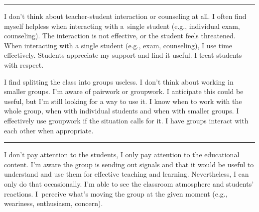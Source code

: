 \rule{\textwidth}{0.4pt}
{I don't think about teacher-student interaction or counseling at all.}
{I often find myself helpless when interacting with a~single student (e.g., individual exam, counseling). The interaction is not effective, or the student feels threatened.}
{When interacting with a single student (e.g., exam, counseling), I use time effectively. Students appreciate my support and find it useful. I treat students with respect. }

\newpage
{}
{I find splitting the class into groups useless. I don't think about working in smaller groups.}
{I'm aware of pairwork or groupwork. I anticipate this could be useful, but I'm still looking for a way to use it.}
{I know when to work with the whole group, when with individual students and when with smaller groups. I effectively use groupwork if the situation calls for it. I have groups interact with each other when appropriate.}

\rule{\textwidth}{0.4pt}
{I don't pay attention to the students, I only pay attention to the educational content.}
{I'm aware the group is sending out signals and that it would be useful to understand and use them for effective teaching and learning. Nevertheless, I can only do that occasionally.}
{I'm able to see the classroom atmosphere and students' reactions. I~perceive what's moving the group at the given moment (e.g., weariness, enthusiasm, concern).}
